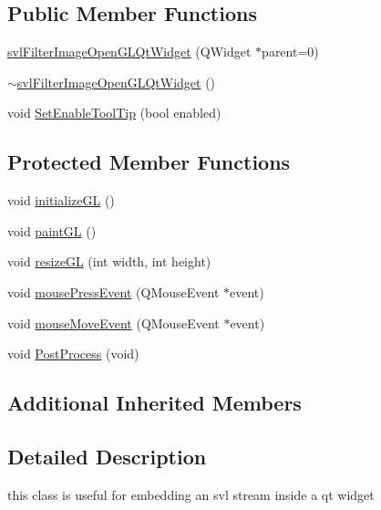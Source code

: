 \subsection*{Public Member Functions}
\begin{DoxyCompactItemize}
\item 
\hyperlink{classsvl_filter_image_open_g_l_qt_widget_a0fd4cbb890ee25b373a976bd8ad742c7}{svl\-Filter\-Image\-Open\-G\-L\-Qt\-Widget} (Q\-Widget $\ast$parent=0)
\item 
\hyperlink{classsvl_filter_image_open_g_l_qt_widget_a9c55e170d300750fd00486c38d5381c9}{$\sim$svl\-Filter\-Image\-Open\-G\-L\-Qt\-Widget} ()
\item 
void \hyperlink{classsvl_filter_image_open_g_l_qt_widget_aa0dd538e8e279915eeaaee546fd9086c}{Set\-Enable\-Tool\-Tip} (bool enabled)
\end{DoxyCompactItemize}
\subsection*{Protected Member Functions}
\begin{DoxyCompactItemize}
\item 
void \hyperlink{classsvl_filter_image_open_g_l_qt_widget_ac8e99a2a2728e0e1492f2d499517fe3c}{initialize\-G\-L} ()
\item 
void \hyperlink{classsvl_filter_image_open_g_l_qt_widget_a9b2fcfe43542bcf8f0b124a44ab50f4c}{paint\-G\-L} ()
\item 
void \hyperlink{classsvl_filter_image_open_g_l_qt_widget_a3026b2e198323b23d2d9009b3d33c37b}{resize\-G\-L} (int width, int height)
\item 
void \hyperlink{classsvl_filter_image_open_g_l_qt_widget_ac7fe9e7030ba3585c79de282523ba85a}{mouse\-Press\-Event} (Q\-Mouse\-Event $\ast$event)
\item 
void \hyperlink{classsvl_filter_image_open_g_l_qt_widget_a827d374825864c23aaaf4b42794f7178}{mouse\-Move\-Event} (Q\-Mouse\-Event $\ast$event)
\item 
void \hyperlink{classsvl_filter_image_open_g_l_qt_widget_a7cf18eeadf63922000d94d366ea749d9}{Post\-Process} (void)
\end{DoxyCompactItemize}
\subsection*{Additional Inherited Members}


\subsection{Detailed Description}
this class is useful for embedding an svl stream inside a qt widget 

